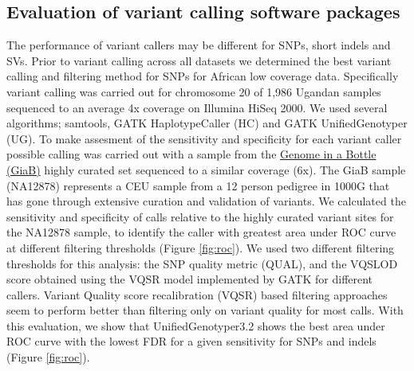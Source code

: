 \subsection{Evaluation of variant calling software packages}
The performance of variant callers may be different for SNPs, short indels and SVs. Prior to variant calling across all datasets we determined the best variant calling and filtering method for SNPs for African low coverage data. Specifically variant calling was carried out for chromosome 20 of 1,986 Ugandan samples sequenced to an average 4x coverage on Illumina HiSeq 2000. We used several algorithms; samtools, GATK HaplotypeCaller (HC) and GATK UnifiedGenotyper (UG). To make assesment of the sensitivity and specificity for each variant caller possible calling was carried out with a sample from the \href{http://genomeinabottle.org}{Genome in a Bottle (GiaB)} highly curated set sequenced to a similar coverage (6x). The GiaB sample (NA12878) represents a CEU sample from a 12 person pedigree in 1000G that has gone through extensive curation and validation of variants.\cite{Zook2014}
We calculated the sensitivity and specificity of calls relative to the highly curated variant sites for the NA12878 sample, to identify the caller with greatest area under ROC curve at different filtering thresholds (Figure \ref{fig:roc}). We used two different filtering thresholds for this analysis: the SNP quality metric (QUAL), and the VQSLOD score obtained using the VQSR model implemented by GATK for different callers. Variant Quality score recalibration (VQSR) based filtering approaches seem to perform better than filtering only on variant quality for most calls. With this evaluation, we show that UnifiedGenotyper3.2 shows the best area under ROC curve with the lowest FDR for a given sensitivity for SNPs and indels (Figure \ref{fig:roc}).%


